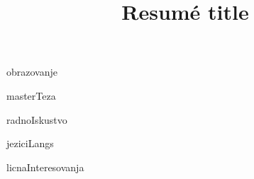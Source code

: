 \documentclass[11pt,a4paper,sans]{moderncv}        %
\title{Resumé title}                               %
\begin{document}
\makecvtitle

obrazovanje

masterTeza

radnoIskustvo

jeziciLangs

licnaInteresovanja
\end{document}
